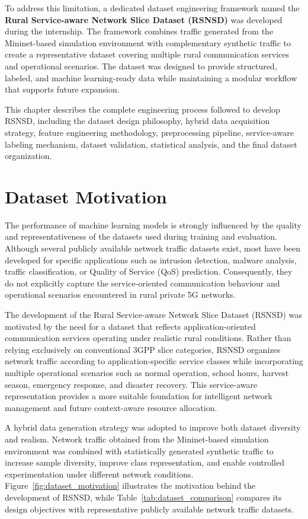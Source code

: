 \documentclass[12pt,a4paper]{report}
\begin{document}
	To address this limitation, a dedicated dataset engineering framework named the \textbf{Rural Service-aware Network Slice Dataset (RSNSD)} was developed during the internship. The framework combines traffic generated from the Mininet-based simulation environment with complementary synthetic traffic to create a representative dataset covering multiple rural communication services and operational scenarios. The dataset was designed to provide structured, labeled, and machine learning-ready data while maintaining a modular workflow that supports future expansion.
	
	This chapter describes the complete engineering process followed to develop RSNSD, including the dataset design philosophy, hybrid data acquisition strategy, feature engineering methodology, preprocessing pipeline, service-aware labeling mechanism, dataset validation, statistical analysis, and the final dataset organization.
	
	\section{Dataset Motivation}
	\label{sec:dataset_motivation}
	
	The performance of machine learning models is strongly influenced by the quality and representativeness of the datasets used during training and evaluation. Although several publicly available network traffic datasets exist, most have been developed for specific applications such as intrusion detection, malware analysis, traffic classification, or Quality of Service (QoS) prediction. Consequently, they do not explicitly capture the service-oriented communication behaviour and operational scenarios encountered in rural private 5G networks.
	
	The development of the Rural Service-aware Network Slice Dataset (RSNSD) was motivated by the need for a dataset that reflects application-oriented communication services operating under realistic rural conditions. Rather than relying exclusively on conventional 3GPP slice categories, RSNSD organizes network traffic according to application-specific service classes while incorporating multiple operational scenarios such as normal operation, school hours, harvest season, emergency response, and disaster recovery. This service-aware representation provides a more suitable foundation for intelligent network management and future context-aware resource allocation.
	
	A hybrid data generation strategy was adopted to improve both dataset diversity and realism. Network traffic obtained from the Mininet-based simulation environment was combined with statistically generated synthetic traffic to increase sample diversity, improve class representation, and enable controlled experimentation under different network conditions. Figure~\ref{fig:dataset_motivation} illustrates the motivation behind the development of RSNSD, while Table~\ref{tab:dataset_comparison} compares its design objectives with representative publicly available network traffic datasets.
	
\end{document}
